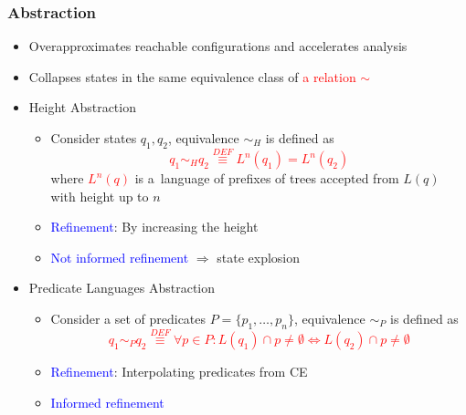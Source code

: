 \documentclass{beamer}
\newcommand{\hlbl}[1]{\textcolor{blue}{#1}}
\newcommand{\hlgr}[1]{\textcolor{olive!50!green}{#1}}
\newcommand{\hlrd}[1]{\textcolor{red}{#1}}
\begin{document}
\begin{frame}
\frametitle{Abstraction}

	\begin{itemize}
		\item Overapproximates reachable configurations and accelerates analysis
		\item Collapses states in the same equivalence class of \hlrd{a relation $\sim$}
		\item \hlgr{Height Abstraction}
		\begin{itemize}
			\item Consider states $q_1, q_2$, equivalence $\sim_H$ is defined as
				\hlrd{$$q_1 \sim_H q_2 \stackrel{DEF}{\equiv} L^n(q_1) = L^n(q_2)$$}\noindent where
				\hlrd{$L^n(q)$} is a~language of prefixes of trees accepted from $L(q)$ with height up to $n$
			\item \hlbl{Refinement}: By increasing the height
			\item \hlbl{Not informed refinement} $\Rightarrow$ state explosion
		\end{itemize}

		\pause
	    \item \hlgr{Predicate Languages Abstraction}
		\begin{itemize}
			\item Consider a set of predicates $P=\{p_1,\ldots,p_n\}$,
				equivalence $\sim_P$ is defined as
				\hlrd{$$q_1 \sim_P q_2 \stackrel{DEF}{\equiv} \forall p\in P: L(q_1) \cap p \neq \emptyset \Leftrightarrow L(q_2) \cap p \neq \emptyset$$}
			\item \hlbl{Refinement}: Interpolating predicates from CE
			\item \hlbl{Informed refinement} 
		\end{itemize}
	\end{itemize}


\end{frame}

\end{document}
